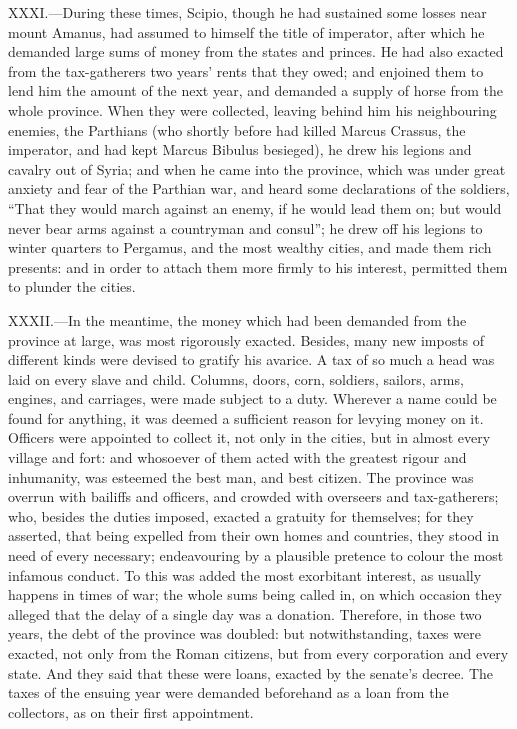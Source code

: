 XXXI.—During these times, Scipio, though he had sustained some losses
near mount Amanus, had assumed to himself the title of imperator, after
which he demanded large sums of money from the states and princes. He
had also exacted from the tax-gatherers two years' rents that they owed;
and enjoined them to lend him the amount of the next year, and demanded
a supply of horse from the whole province. When they were collected,
leaving behind him his neighbouring enemies, the Parthians (who shortly
before had killed Marcus Crassus, the imperator, and had kept Marcus
Bibulus besieged), he drew his legions and cavalry out of Syria; and
when he came into the province, which was under great anxiety and fear
of the Parthian war, and heard some declarations of the soldiers, ``That
they would march against an enemy, if he would lead them on; but would
never bear arms against a countryman and consul''; he drew off his
legions to winter quarters to Pergamus, and the most wealthy cities, and
made them rich presents: and in order to attach them more firmly to his
interest, permitted them to plunder the cities.

XXXII.—In the meantime, the money which had been demanded from the
province at large, was most rigorously exacted. Besides, many new
imposts of different kinds were devised to gratify his avarice. A tax of
so much a head was laid on every slave and child. Columns, doors, corn,
soldiers, sailors, arms, engines, and carriages, were made subject to a
duty. Wherever a name could be found for anything, it was deemed a
sufficient reason for levying money on it. Officers were appointed to
collect it, not only in the cities, but in almost every village and
fort: and whosoever of them acted with the greatest rigour and
inhumanity, was esteemed the best man, and best citizen. The province
was overrun with bailiffs and officers, and crowded with overseers and
tax-gatherers; who, besides the duties imposed, exacted a gratuity for
themselves; for they asserted, that being expelled from their own homes
and countries, they stood in need of every necessary; endeavouring by a
plausible pretence to colour the most infamous conduct. To this was
added the most exorbitant interest, as usually happens in times of war;
the whole sums being called in, on which occasion they alleged that the
delay of a single day was a donation. Therefore, in those two years, the
debt of the province was doubled: but notwithstanding, taxes were
exacted, not only from the Roman citizens, but from every corporation
and every state. And they said that these were loans, exacted by the
senate's decree. The taxes of the ensuing year were demanded beforehand
as a loan from the collectors, as on their first appointment.

